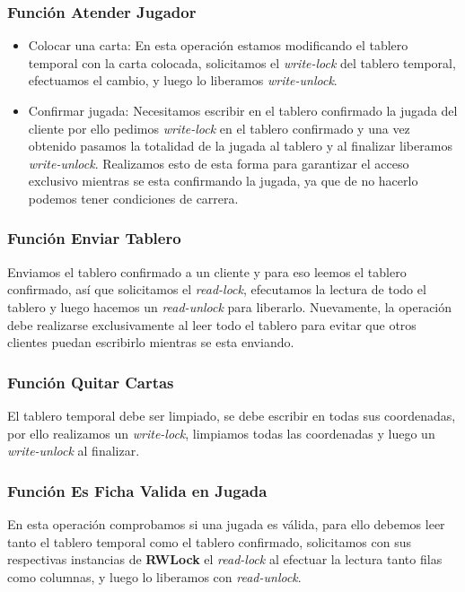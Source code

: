 \subsubsection{Función Atender Jugador}
\begin{itemize}
	\item Colocar una carta: En esta operación estamos modificando el tablero temporal con la carta colocada, solicitamos el \textit{write-lock} del tablero temporal, efectuamos el cambio, y luego lo liberamos \textit{write-unlock}.
	\item Confirmar jugada: Necesitamos escribir en el tablero confirmado la jugada del cliente por ello pedimos \textit{write-lock} en el tablero confirmado y una vez obtenido pasamos la totalidad de la jugada al tablero y al finalizar liberamos \textit{write-unlock}. Realizamos esto de esta forma para garantizar el acceso exclusivo mientras se esta confirmando la jugada, ya que de no hacerlo podemos tener condiciones de carrera.
\end{itemize}


\subsubsection{Función Enviar Tablero}

Enviamos el tablero confirmado a un cliente y para eso leemos el tablero confirmado, así que solicitamos el \textit{read-lock}, efecutamos la lectura de todo el tablero y luego hacemos un \textit{read-unlock} para liberarlo. Nuevamente, la operación debe realizarse exclusivamente al leer todo el tablero para evitar que otros clientes puedan escribirlo mientras se esta enviando. 

\subsubsection{Función Quitar Cartas}

El tablero temporal debe ser limpiado, se debe escribir en todas sus coordenadas, por ello realizamos un \textit{write-lock}, limpiamos todas las coordenadas y luego un \textit{write-unlock} al finalizar.

\subsubsection{Función Es Ficha Valida en Jugada}

En esta operación comprobamos si una jugada es válida, para ello debemos leer tanto el tablero temporal como el tablero confirmado, solicitamos con sus respectivas instancias de \textbf{RWLock} el \textit{read-lock} al efectuar la lectura tanto filas como columnas, y luego lo liberamos con \textit{read-unlock}.

